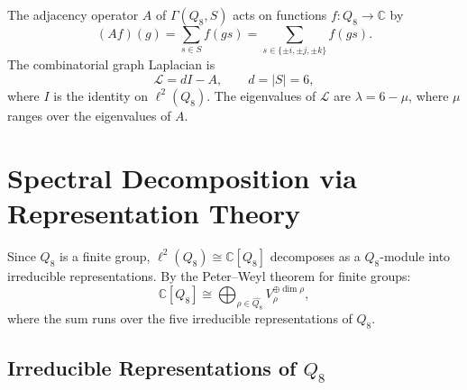 \documentclass[11pt,a4paper]{article}
\begin{document}
      The adjacency operator $A$ of $\Gamma(Q_8, S)$ acts on functions
      $f \colon Q_8 \to \mathbb{C}$ by
      \begin{equation}
        (Af)(g) = \sum_{s \in S} f(gs)
      = \sum_{s \in \{\pm i, \pm j, \pm k\}} f(gs).
      \end{equation}
      The combinatorial graph Laplacian is
      \begin{equation}
        \mathcal{L} = dI - A,
        \qquad
        d = |S| = 6,
      \end{equation}
      where $I$ is the identity on $\ell^2(Q_8)$.
      The eigenvalues of $\mathcal{L}$ are $\lambda = 6 - \mu$, where $\mu$ ranges over
      the eigenvalues of $A$.

  \section{Spectral Decomposition via Representation Theory}

    Since $Q_8$ is a finite group, $\ell^2(Q_8) \cong \mathbb{C}[Q_8]$ decomposes
    as a $Q_8$-module into irreducible representations.
    By the Peter--Weyl theorem for finite groups:
    \begin{equation}
      \mathbb{C}[Q_8] \cong \bigoplus_{\rho \in \widehat{Q_8}} V_\rho^{\oplus \dim \rho},
    \end{equation}
    where the sum runs over the five irreducible representations of $Q_8$.

    \subsection{Irreducible Representations of $Q_8$}
\end{document}
